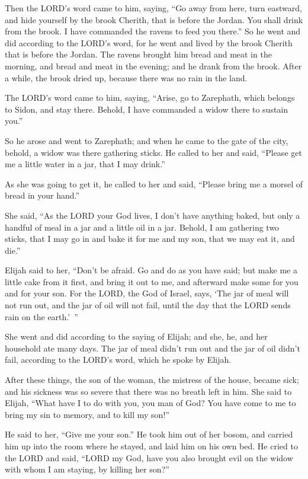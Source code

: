 \myverse{}Then the LORD’s word came to him, saying,
\myverse{}“Go away from here, turn eastward, and hide yourself by the brook Cherith,
that is before the Jordan.
\myverse{}You shall drink from the brook. I have commanded the ravens to feed you there.”
\myverse{}So he went and did according to the LORD’s word, for he went and lived by the
brook Cherith that is before the Jordan.
\myverse{}The ravens brought him bread and meat in the morning, and bread and meat in
the evening; and he drank from the brook.
\myverse{}After a while, the brook dried up, because there was no rain in the land.

\myverse{}The LORD’s word came to him, saying,
\myverse{}“Arise, go to Zarephath, which belongs to Sidon, and stay there. Behold, I
have commanded a widow there to sustain you.”

\myverse{}So he arose and went to Zarephath; and when he came to the gate
of the city, behold, a widow was there gathering sticks. He called to her and said, “Please get me a little
water in a jar, that I may drink.”

\myverse{}As she was going to get it, he called to her and said, “Please
bring me a morsel of bread in your hand.”

\myverse{}She said, “As the LORD your God lives, I don’t have anything
baked, but only a handful of meal in a jar and a little oil in a jar. Behold, I am gathering two sticks,
that I may go in and bake it for me and my son, that we may eat it, and die.”

\myverse{}Elijah said to her, “Don’t be afraid. Go and do as you have
said; but make me a little cake from it first, and bring it out to me, and afterward make some for you
and for your son.
\myverse{}For the LORD, the God of Israel, says, ‘The jar of meal will not run out,
and the jar of oil will not fail, until the day that the LORD sends rain on the earth.’ ”

\myverse{}She went and did according to the saying of Elijah; and she,
he, and her household ate many days.
\myverse{}The jar of meal didn’t run out and the jar of oil didn’t fail, according
to the LORD’s word, which he spoke by Elijah.

\myverse{}After these things, the son of the woman, the mistress of the
house, became sick; and his sickness was so severe that there was no breath left in him.
\myverse{}She said to Elijah, “What have I to do with you, you man of God? You have
come to me to bring my sin to memory, and to kill my son!”

\myverse{}He said to her, “Give me your son.” He took him out of her bosom,
and carried him up into the room where he stayed, and laid him on his own bed.
\myverse{}He cried to the LORD and said, “LORD my God, have you also brought evil on
the widow with whom I am staying, by killing her son?”

